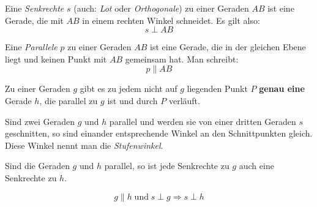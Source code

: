 \begin{defi}[Senkrechte]
 Eine \emph{Senkrechte} \(s\) (auch: \emph{Lot} oder \emph{Orthogonale}) zu einer Geraden \(AB\) ist eine Gerade, die mit \(AB\) in einem rechten Winkel schneidet. Es gilt also:
 \begin{equation*}
  s \perp AB
 \end{equation*}
\end{defi}

\begin{defi}[Parallele]
 Eine \emph{Parallele} \(p\) zu einer Geraden \(AB\) ist eine Gerade, die in der gleichen Ebene liegt und keinen Punkt mit \(AB\) gemeinsam hat. Man schreibt:
 \begin{equation*}
  p \parallel AB
 \end{equation*}
\end{defi}

\begin{defi}[Parallelenaxiom]
 Zu einer Geraden \(g\) gibt es zu jedem nicht auf \(g\) liegenden Punkt \(P\) \textbf{genau eine} Gerade \(h\), die parallel zu \(g\) ist und durch \(P\) verläuft.
\end{defi}

\begin{regel}[Stufenwinkel]
 Sind zwei Geraden \(g\) und \(h\) parallel und werden sie von einer dritten Geraden \(s\) geschnitten, so sind einander entsprechende Winkel an den Schnittpunkten gleich. Diese Winkel nennt man die \emph{Stufenwinkel}.
\end{regel}

\begin{regel}[Wechselwinkel]
 
\end{regel}

\begin{folg}
 Sind die Geraden \(g\) und \(h\) parallel, so ist jede Senkrechte zu \(g\) auch eine Senkrechte zu \(h\).
 
 \begin{equation*}
  g\parallel h \; \text{und} \; s\perp g \Rightarrow s\perp h
 \end{equation*}

\end{folg}

